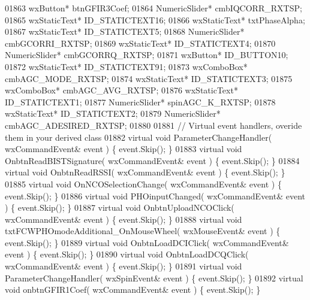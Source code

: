 \begin{DoxyCode}
01863         wxButton* btnGFIR3Coef;
01864         NumericSlider* cmbIQCORR_RXTSP;
01865         wxStaticText* ID_STATICTEXT16;
01866         wxStaticText* txtPhaseAlpha;
01867         wxStaticText* ID_STATICTEXT5;
01868         NumericSlider* cmbGCORRI_RXTSP;
01869         wxStaticText* ID_STATICTEXT4;
01870         NumericSlider* cmbGCORRQ_RXTSP;
01871         wxButton* ID_BUTTON10;
01872         wxStaticText* ID_STATICTEXT91;
01873         wxComboBox* cmbAGC_MODE_RXTSP;
01874         wxStaticText* ID_STATICTEXT3;
01875         wxComboBox* cmbAGC_AVG_RXTSP;
01876         wxStaticText* ID_STATICTEXT1;
01877         NumericSlider* spinAGC_K_RXTSP;
01878         wxStaticText* ID_STATICTEXT2;
01879         NumericSlider* cmbAGC_ADESIRED_RXTSP;
01880         
01881         \textcolor{comment}{// Virtual event handlers, overide them in your derived class}
01882         \textcolor{keyword}{virtual} \textcolor{keywordtype}{void} ParameterChangeHandler( wxCommandEvent& event ) \{ \textcolor{keyword}{event}.Skip(); \}
01883         \textcolor{keyword}{virtual} \textcolor{keywordtype}{void} OnbtnReadBISTSignature( wxCommandEvent& event ) \{ \textcolor{keyword}{event}.Skip(); \}
01884         \textcolor{keyword}{virtual} \textcolor{keywordtype}{void} OnbtnReadRSSI( wxCommandEvent& event ) \{ \textcolor{keyword}{event}.Skip(); \}
01885         \textcolor{keyword}{virtual} \textcolor{keywordtype}{void} OnNCOSelectionChange( wxCommandEvent& event ) \{ \textcolor{keyword}{event}.Skip(); \}
01886         \textcolor{keyword}{virtual} \textcolor{keywordtype}{void} PHOinputChanged( wxCommandEvent& event ) \{ \textcolor{keyword}{event}.Skip(); \}
01887         \textcolor{keyword}{virtual} \textcolor{keywordtype}{void} OnbtnUploadNCOClick( wxCommandEvent& event ) \{ \textcolor{keyword}{event}.Skip(); \}
01888         \textcolor{keyword}{virtual} \textcolor{keywordtype}{void} txtFCWPHOmodeAdditional_OnMouseWheel( wxMouseEvent& event ) \{ \textcolor{keyword}{event}.Skip(); \}
01889         \textcolor{keyword}{virtual} \textcolor{keywordtype}{void} OnbtnLoadDCIClick( wxCommandEvent& event ) \{ \textcolor{keyword}{event}.Skip(); \}
01890         \textcolor{keyword}{virtual} \textcolor{keywordtype}{void} OnbtnLoadDCQClick( wxCommandEvent& event ) \{ \textcolor{keyword}{event}.Skip(); \}
01891         \textcolor{keyword}{virtual} \textcolor{keywordtype}{void} ParameterChangeHandler( wxSpinEvent& event ) \{ \textcolor{keyword}{event}.Skip(); \}
01892         \textcolor{keyword}{virtual} \textcolor{keywordtype}{void} onbtnGFIR1Coef( wxCommandEvent& event ) \{ \textcolor{keyword}{event}.Skip(); \}

\end{DoxyCode}
